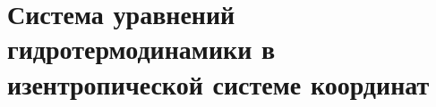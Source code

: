 \chapter{Система уравнений гидротермодинамики в изентропической системе координат}
    \lipsum[1-2]

